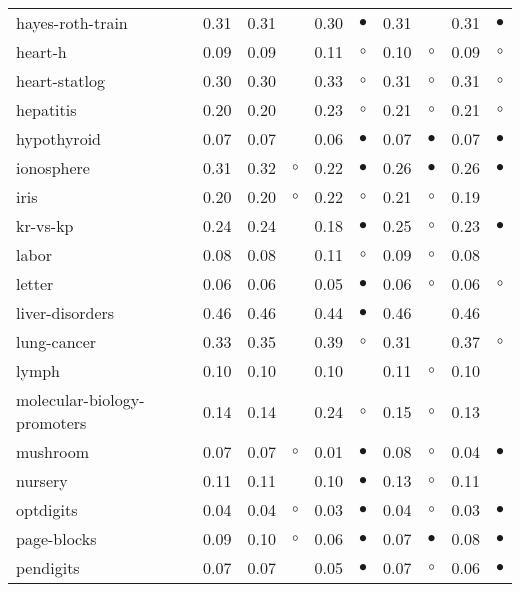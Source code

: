 \begin{table}[thb]
{\begin{tabular}{lrr@{\hspace{0.1cm}}cr@{\hspace{0.1cm}}cr@{\hspace{0.1cm}}cr@{\hspace{0.1cm}}c}
hayes-roth-train & 0.31 & 0.31 &           & 0.30 & $\bullet$ & 0.31 &           & 0.31 &  $\bullet$\\
heart-h & 0.09 & 0.09 &           & 0.11 &   $\circ$ & 0.10 &   $\circ$ & 0.09 &    $\circ$\\
heart-statlog & 0.30 & 0.30 &           & 0.33 &   $\circ$ & 0.31 &   $\circ$ & 0.31 &    $\circ$\\
hepatitis & 0.20 & 0.20 &           & 0.23 &   $\circ$ & 0.21 &   $\circ$ & 0.21 &    $\circ$\\
hypothyroid & 0.07 & 0.07 &           & 0.06 & $\bullet$ & 0.07 & $\bullet$ & 0.07 &  $\bullet$\\
ionosphere & 0.31 & 0.32 &   $\circ$ & 0.22 & $\bullet$ & 0.26 & $\bullet$ & 0.26 &  $\bullet$\\
iris & 0.20 & 0.20 &   $\circ$ & 0.22 &   $\circ$ & 0.21 &   $\circ$ & 0.19 &           \\
kr-vs-kp & 0.24 & 0.24 &           & 0.18 & $\bullet$ & 0.25 &   $\circ$ & 0.23 &  $\bullet$\\
labor & 0.08 & 0.08 &           & 0.11 &   $\circ$ & 0.09 &   $\circ$ & 0.08 &           \\
letter & 0.06 & 0.06 &           & 0.05 & $\bullet$ & 0.06 &   $\circ$ & 0.06 &    $\circ$\\
liver-disorders & 0.46 & 0.46 &           & 0.44 & $\bullet$ & 0.46 &           & 0.46 &           \\
lung-cancer & 0.33 & 0.35 &           & 0.39 &   $\circ$ & 0.31 &           & 0.37 &    $\circ$\\
lymph & 0.10 & 0.10 &           & 0.10 &           & 0.11 &   $\circ$ & 0.10 &           \\
molecular-biology-promoters & 0.14 & 0.14 &           & 0.24 &   $\circ$ & 0.15 &   $\circ$ & 0.13 &           \\
mushroom & 0.07 & 0.07 &   $\circ$ & 0.01 & $\bullet$ & 0.08 &   $\circ$ & 0.04 &  $\bullet$\\
nursery & 0.11 & 0.11 &           & 0.10 & $\bullet$ & 0.13 &   $\circ$ & 0.11 &           \\
optdigits & 0.04 & 0.04 &   $\circ$ & 0.03 & $\bullet$ & 0.04 &   $\circ$ & 0.03 &  $\bullet$\\
page-blocks & 0.09 & 0.10 &   $\circ$ & 0.06 & $\bullet$ & 0.07 & $\bullet$ & 0.08 &  $\bullet$\\
pendigits & 0.07 & 0.07 &           & 0.05 & $\bullet$ & 0.07 &   $\circ$ & 0.06 &  $\bullet$\\

\end{tabular}}
\end{table}
